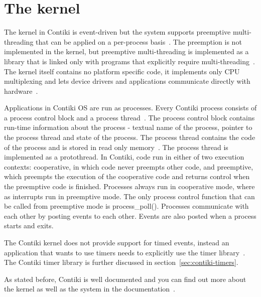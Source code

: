 
\section{The kernel}
The kernel in Contiki is event-driven but the system supports preemptive
multi-threading that can be applied on a per-process basis~\cite{video}.
The preemption is not implemented in the kernel, but
preemptive multi-threading is implemented as a library that is linked only with programs that
explicitly require multi-threading~\cite{paper-contiki}.
The kernel itself contains no platform specific code, it implements only CPU multiplexing and
lets device drivers and applications communicate directly with hardware~\cite{video}.

Applications in Contiki OS are run as processes.
Every Contiki process consists of a process control block and a process thread~\cite{contiki-wiki-processes}.
The process control block contains run-time information about the process -
textual name of the process, pointer to the process thread and state of the process.
The process thread contains the code of the process and is stored in read only memory~\cite{contiki-wiki-processes}.
The process thread is implemented as a protothread.
In Contiki, code run in either of two execution contexts:
cooperative, in which code never preempts other code, and preemptive,
which preempts the execution of the cooperative code and returns control
when the preemptive code is finished.
Processes always run in cooperative mode, where as interrupts run in preemptive mode.
The only process control function that can be called from preemptive mode is process_poll(). 
Processes communicate with each other by posting events to each other.
Events are also posted when a process starts and exits.

The Contiki kernel does not provide support for timed events,
instead an application that wants to use timers needs to explicitly use the timer library~\cite{contiki-docs}.
The Contiki timer library is further discussed in section~\ref{sec:contiki-timers}.

As stated before, Contiki is well documented and you can find out more about
the kernel as well as the system in the documentation~\cite{contiki-docs}.
